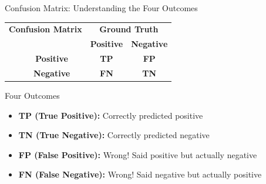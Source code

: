 \documentclass[usenames,dvipsnames]{beamer}
\begin{document}
\begin{frame}{Confusion Matrix: Understanding the Four Outcomes}

\begin{center}
	\renewcommand{\arraystretch}{1.5}
	\begin{tabular}{cccc}
		\multicolumn{2}{c}{\textbf{Confusion Matrix}} & \multicolumn{2}{c}{\textbf{Ground Truth}} \\
		\multicolumn{2}{c}{} & \textbf{Positive} & \textbf{Negative} \\
		\multirow{2}{*}{\rotatebox[origin=c]{90}{\textbf{Predicted}}} 
		& \textbf{Positive} & \cellcolor{green!40}\textbf{TP} & \cellcolor{orange!40}\textbf{FP} \\
		& \textbf{Negative} & \cellcolor{red!40}\textbf{FN} & \cellcolor{blue!40}\textbf{TN} \\
	\end{tabular}
\end{center}

\vspace{0.3cm}
\begin{definitionbox}{Four Outcomes}
	\begin{itemize}
		\item \textcolor{green!70!black}{\textbf{TP (True Positive):}} Correctly predicted positive 
		\item \textcolor{blue!70!black}{\textbf{TN (True Negative):}} Correctly predicted negative  
		\item \textcolor{orange!70!black}{\textbf{FP (False Positive):}} Wrong! Said positive but actually negative
		\item \textcolor{red!70!black}{\textbf{FN (False Negative):}} Wrong! Said negative but actually positive
	\end{itemize}
\end{definitionbox}
\end{frame}
\end{document}
